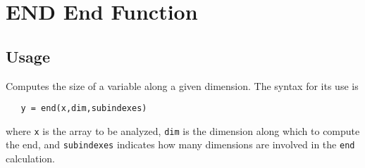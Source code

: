 \section{END End Function}

\subsection{Usage}

Computes the size of a variable along a given dimension.  The syntax
for its use is 
\begin{verbatim}
   y = end(x,dim,subindexes)
\end{verbatim}
where \verb|x| is the array to be analyzed, \verb|dim| is the dimension along
which to compute the end, and \verb|subindexes| indicates how many dimensions
are involved in the \verb|end| calculation.
